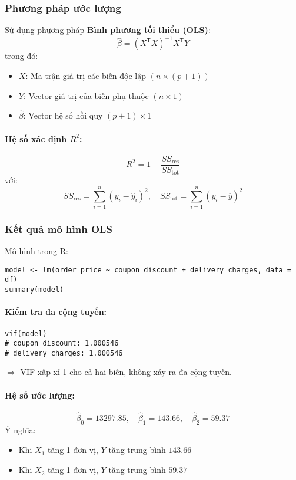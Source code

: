 \subsubsection{Phương pháp ước lượng}
Sử dụng phương pháp \textbf{Bình phương tối thiểu (OLS)}:
\[
\hat{\beta} = (X^\mathsf{T}X)^{-1} X^\mathsf{T} Y
\]
trong đó:
\begin{itemize}
    \item $X$: Ma trận giá trị các biến độc lập $(n \times (p+1))$
    \item $Y$: Vector giá trị của biến phụ thuộc $(n \times 1)$
    \item $\hat{\beta}$: Vector hệ số hồi quy $(p+1) \times 1$
\end{itemize}

\paragraph{Hệ số xác định $R^2$:}
\[
R^2 = 1 - \frac{SS_\text{res}}{SS_\text{tot}}
\]
với:
\[
SS_\text{res} = \sum_{i=1}^n (y_i - \hat{y}_i)^2, \quad SS_\text{tot} = \sum_{i=1}^n (y_i - \overline{y})^2
\]

\subsubsection{Kết quả mô hình OLS}
Mô hình trong R:
\begin{verbatim}
model <- lm(order_price ~ coupon_discount + delivery_charges, data = df)
summary(model)
\end{verbatim}

\paragraph{Kiểm tra đa cộng tuyến:}
\begin{verbatim}
vif(model)
# coupon_discount: 1.000546
# delivery_charges: 1.000546
\end{verbatim}
$\Rightarrow$ VIF xấp xỉ 1 cho cả hai biến, không xảy ra đa cộng tuyến.

\paragraph{Hệ số ước lượng:}
\[
\hat{\beta}_0 = 13297.85, \quad \hat{\beta}_1 = 143.66, \quad \hat{\beta}_2 = 59.37
\]
Ý nghĩa:
\begin{itemize}
    \item Khi $X_1$ tăng 1 đơn vị, $Y$ tăng trung bình $143.66$
    \item Khi $X_2$ tăng 1 đơn vị, $Y$ tăng trung bình $59.37$
\end{itemize}

